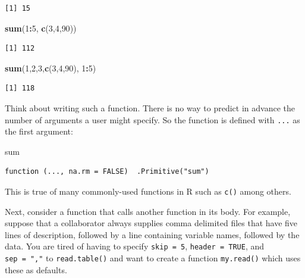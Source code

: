 \documentclass[
]{krantz}
\makeatletter
\newenvironment{Shaded}{\begin{snugshade}}{\end{snugshade}}
\newcommand{\DecValTok}[1]{\textcolor[rgb]{0.06,0.06,0.06}{#1}}
\newcommand{\KeywordTok}[1]{\textcolor[rgb]{0.27,0.27,0.27}{\textbf{#1}}}
\newcommand{\NormalTok}[1]{#1}
\newcommand{\OperatorTok}[1]{\textcolor[rgb]{0.43,0.43,0.43}{\textbf{#1}}}
\newenvironment{kframe}{%
\medskip{}
\setlength{\fboxsep}{.8em}
 \def\at@end@of@kframe{}%
 \ifinner\ifhmode%
  \def\at@end@of@kframe{\end{minipage}}%
  \begin{minipage}{\columnwidth}%
 \fi\fi%
 \def\FrameCommand##1{\hskip\@totalleftmargin \hskip-\fboxsep
 \colorbox{shadecolor}{##1}\hskip-\fboxsep
     \hskip-\linewidth \hskip-\@totalleftmargin \hskip\columnwidth}%
 \MakeFramed {\advance\hsize-\width
   \@totalleftmargin\z@ \linewidth\hsize
   \@setminipage}}%
 {\par\unskip\endMakeFramed%
 \at@end@of@kframe}
\renewenvironment{Shaded}{\begin{kframe}}{\end{kframe}}
\makeatother
\begin{document}
\begin{verbatim}
[1] 15
\end{verbatim}

\begin{Shaded}
\begin{Highlighting}[]
\KeywordTok{sum}\NormalTok{(}\DecValTok{1}\OperatorTok{:}\DecValTok{5}\NormalTok{, }\KeywordTok{c}\NormalTok{(}\DecValTok{3}\NormalTok{,}\DecValTok{4}\NormalTok{,}\DecValTok{90}\NormalTok{))}
\end{Highlighting}
\end{Shaded}

\begin{verbatim}
[1] 112
\end{verbatim}

\begin{Shaded}
\begin{Highlighting}[]
\KeywordTok{sum}\NormalTok{(}\DecValTok{1}\NormalTok{,}\DecValTok{2}\NormalTok{,}\DecValTok{3}\NormalTok{,}\KeywordTok{c}\NormalTok{(}\DecValTok{3}\NormalTok{,}\DecValTok{4}\NormalTok{,}\DecValTok{90}\NormalTok{), }\DecValTok{1}\OperatorTok{:}\DecValTok{5}\NormalTok{)}
\end{Highlighting}
\end{Shaded}

\begin{verbatim}
[1] 118
\end{verbatim}

Think about writing such a function. There is no way to predict in advance the number of arguments a user might specify. So the function is defined with \texttt{...} as the first argument:

\begin{Shaded}
\begin{Highlighting}[]
\NormalTok{sum}
\end{Highlighting}
\end{Shaded}

\begin{verbatim}
function (..., na.rm = FALSE)  .Primitive("sum")
\end{verbatim}

This is true of many commonly-used functions in R such as \texttt{c()} among others.

Next, consider a function that calls another function in its body. For example, suppose that a collaborator always supplies comma delimited files that have five lines of description, followed by a line containing variable names, followed by the data. You are tired of having to specify \texttt{skip\ =\ 5}, \texttt{header\ =\ TRUE}, and \texttt{sep\ =\ ","} to \texttt{read.table()} and want to create a function \texttt{my.read()} which uses these as defaults.
\end{document}
